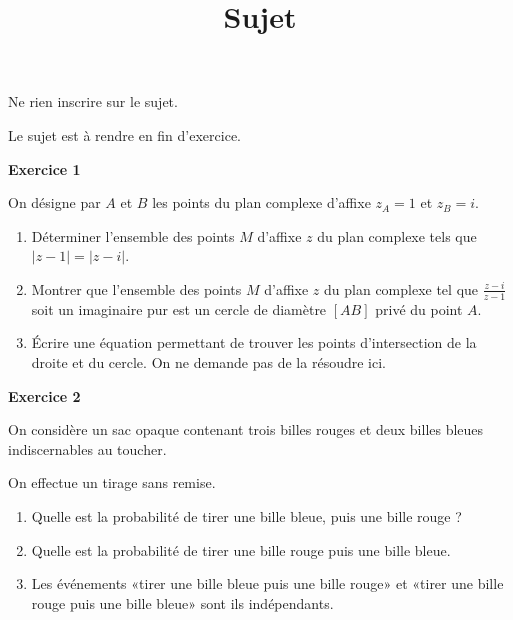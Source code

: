 \documentclass[12pt,a4paper,french]{article}
\author{}
\title{Sujet \no{2}}
\date{}
\begin{document}
\maketitle
\begin{center}Ne rien inscrire sur le sujet.

  Le sujet est à rendre en fin d'exercice.
\end{center}

\bigskip

\textbf{Exercice 1}

On désigne par $A$ et $B$ les points du plan complexe d'affixe $z_A = 1$
et $z_B = i$.
\begin{enumerate}
  \item Déterminer l'ensemble des points $M$ d'affixe $z$ du plan
    complexe tels que $\left\lvert z - 1 \right\rvert = \left\lvert z -
    i \right\rvert$.
  \item Montrer que l'ensemble des points $M$ d'affixe $z$ du plan
    complexe tel que $\frac{z - i}{z -1}$ soit un imaginaire pur est un
    cercle de diamètre $[AB]$ privé du point $A$.
  \item Écrire une équation permettant de trouver les points
    d'intersection de la droite et du cercle. On ne demande pas de la
    résoudre ici.
\end{enumerate}

\medskip

\textbf{Exercice 2}

On considère un sac opaque contenant trois billes rouges et deux billes
bleues indiscernables au toucher.

On effectue un tirage sans remise.

\begin{enumerate}
  \item Quelle est la probabilité de tirer une bille bleue, puis une
    bille rouge ?
  \item Quelle est la probabilité de tirer une bille rouge puis une
    bille bleue.
  \item Les événements «tirer une bille bleue puis une bille rouge» et
    «tirer une bille rouge puis une bille bleue» sont ils indépendants.
\end{enumerate}
\end{document}
